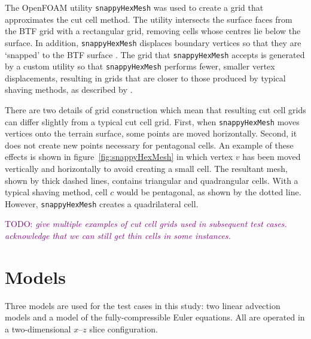 \documentclass{ametsoc}
\newcommand{\TODO}[1]{\textcolor{purple}{TODO: \emph{#1}}}
\begin{document}
The OpenFOAM utility \texttt{snappyHexMesh} was used to create a grid that approximates the cut cell method.
The utility intersects the surface faces from the BTF grid with a rectangular grid, removing cells whose centres lie below the surface.
In addition, \texttt{snappyHexMesh} displaces boundary vertices so that they are `snapped' to the BTF surface \citep{openfoam2015}.
The grid that \texttt{snappyHexMesh} accepts is generated by a custom utility so that \texttt{snappyHexMesh} performs fewer, smaller vertex displacements, resulting in grids that are closer to those produced by typical shaving methods, as described by \citet{adcroft1997}.

There are two details of grid construction which mean that resulting cut cell grids can differ slightly from a typical cut cell grid.  First, when \texttt{snappyHexMesh} moves vertices onto the terrain surface, some points are moved horizontally.  Second, it does not create new points necessary for pentagonal cells.  An example of these effects is shown in figure~\ref{fig:snappyHexMesh} in which vertex $v$ has been moved vertically and horizontally to avoid creating a small cell.  The resultant mesh, shown by thick dashed lines, contains triangular and quadrangular cells.  With a typical shaving method, cell $c$ would be pentagonal, as shown by the dotted line.  However, \texttt{snappyHexMesh} creates a quadrilateral cell.

\TODO{give multiple examples of cut cell grids used in subsequent test cases.  acknowledge that we can still get thin cells in some instances.}


\section{Models}
\label{sec:model}
Three models are used for the test cases in this study: two linear advection models and a model of the fully-compressible Euler equations.  All are operated in a two-dimensional $x$--$z$ slice configuration.
\end{document}
